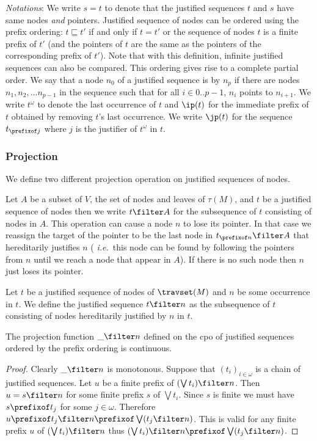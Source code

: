 \bigskip

\emph{Notations}: We write $s = t$ to denote that the justified sequences $t$ and $s$
have same nodes \emph{and} pointers. Justified sequence of nodes can
be ordered using the prefix ordering: $t \sqsubseteq t'$ if and only
if $t=t'$ or the sequence of nodes $t$ is a finite prefix of $t'$
(and the pointers of $t$ are the same as the pointers of the
corresponding prefix of $t'$). Note that with this definition,
infinite justified sequences can also be compared. This ordering
gives rise to a complete partial order.
We say that a node $n_0$ of a justified sequence is  by $n_p$ if there are nodes $n_1, n_2, \ldots n_{p-1}$ in the sequence such that for all $i\in 0..p-1$, $n_i$ points to $n_{i+1}$.
We write $t^\omega$ to denote the last occurrence of $t$ and $\ip(t)$ for the immediate prefix of $t$ obtained by removing $t$'s last occurrence. We write $\jp(t)$ for the sequence $t_{\prefixof j}$ where $j$ is the justifier of $t^\omega$ in $t$.
\smallskip

\subsubsection{Projection}

We define two different projection operation on justified sequences
of nodes.

Let $A$ be a subset of $V$, the set of nodes and leaves of
$\tau(M)$, and $t$ be  a justified sequence of nodes then we write
$t\filter A$ for the subsequence of $t$ consisting of nodes in $A$.
This operation can cause a node $n$ to lose its pointer. In that
case we reassign the target of the pointer to be the last node in
$t_{\prefixof n}\filter A$ that hereditarily justifies $n$ ({\it
i.e.}\ this node can be found by following the pointers from $n$
until we reach a node that appear in $A$). If there is no such node
then $n$ just loses its pointer.


\begin{definition}
Let $t$ be a justified sequence of nodes of $\travset(M)$ and $n$ be
some occurrence in $t$. We define the justified sequence $t \filter
n$ as  the subsequence of $t$ consisting of nodes hereditarily
justified by $n$ in $t$.
\end{definition}

\begin{lemma}
\label{lem:projection_continuous} The projection function $\_
\filter n$ defined on the cpo of justified sequences ordered by the
prefix ordering is continuous.
\end{lemma}
\begin{proof}
Clearly $\_ \filter n$ is monotonous.
Suppose that $(t_i)_{i\in\omega}$ is a chain of justified sequences. Let $u$ be a finite prefix of $(\bigvee t_i) \filter n$.
Then $u = s \filter n$ for some finite prefix $s$ of $\bigvee t_i$. Since $s$ is finite we must have $s \prefixof t_j$ for some $j\in\omega$.
Therefore $u \prefixof t_j \filter n \prefixof \bigvee (t_j \filter  n)$.
This is valid for any finite prefix $u$ of $(\bigvee t_i) \filter n$ thus $(\bigvee t_i) \filter  n \prefixof \bigvee (t_j \filter n)$.
\end{proof}


